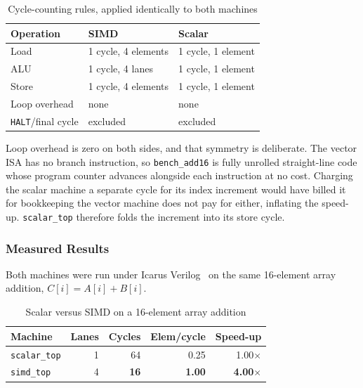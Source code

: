 \begin{table}[htbp]
  \centering
  \caption{Cycle-counting rules, applied identically to both machines}
  \label{tab:cycle_rules}
  \begin{tabular}{@{}lll@{}}
    \toprule
    \textbf{Operation} & \textbf{SIMD} & \textbf{Scalar} \\
    \midrule
    Load        & 1 cycle, 4 elements & 1 cycle, 1 element \\
    ALU         & 1 cycle, 4 lanes    & 1 cycle, 1 element \\
    Store       & 1 cycle, 4 elements & 1 cycle, 1 element \\
    Loop overhead & none              & none \\
    \texttt{HALT}/final cycle & excluded & excluded \\
    \bottomrule
  \end{tabular}
\end{table}

Loop overhead is zero on both sides, and that symmetry is deliberate. The vector
ISA has no branch instruction, so \texttt{bench\_add16} is fully unrolled
straight-line code whose program counter advances alongside each instruction at
no cost. Charging the scalar machine a separate cycle for its index increment
would have billed it for bookkeeping the vector machine does not pay for either,
inflating the speed-up. \texttt{scalar\_top} therefore folds the increment into
its store cycle.

\subsubsection{Measured Results}
Both machines were run under Icarus Verilog~\cite{icarus} on the same
16-element array addition, $C[i] = A[i] + B[i]$.

\begin{table}[htbp]
  \centering
  \caption{Scalar versus SIMD on a 16-element array addition}
  \label{tab:cycle_counts}
  \begin{tabular}{@{}lrrrr@{}}
    \toprule
    \textbf{Machine} & \textbf{Lanes} & \textbf{Cycles} &
    \textbf{Elem/cycle} & \textbf{Speed-up} \\
    \midrule
    \texttt{scalar\_top} & 1 & 64 & 0.25 & 1.00$\times$ \\
    \texttt{simd\_top}   & 4 & \textbf{16} & \textbf{1.00} & \textbf{4.00$\times$} \\
    \bottomrule
  \end{tabular}
\end{table}


